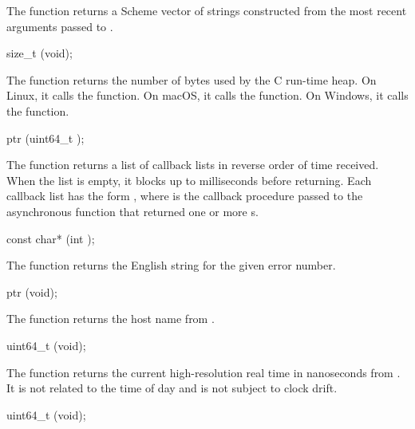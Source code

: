 The  function returns a Scheme vector of strings
constructed from the most recent arguments passed to
.

\begin{function}
  size\_t (void);
\end{function}

The  function returns the number of bytes
used by the C run-time heap. On Linux, it calls the 
function. On macOS, it calls the  function. On Windows,
it calls the  function.

\begin{function}
  ptr (uint64\_t );
\end{function}

The  function returns a list of callback
lists in reverse order of time received. When the list is empty, it
blocks up to  milliseconds before returning. Each
callback list has the form ,
where  is the callback procedure passed to the
asynchronous function that returned one or more s.

\begin{function}
  const char* (int );
\end{function}

The  function returns the English string
for the given error number.

\begin{function}
  ptr (void);
\end{function}

The  function returns the host name from
.

\begin{function}
  uint64\_t (void);
\end{function}

The  function returns the current
high-resolution real time in nanoseconds from . It is
not related to the time of day and is not subject to clock drift.

\begin{function}
  uint64\_t (void);
\end{function}

